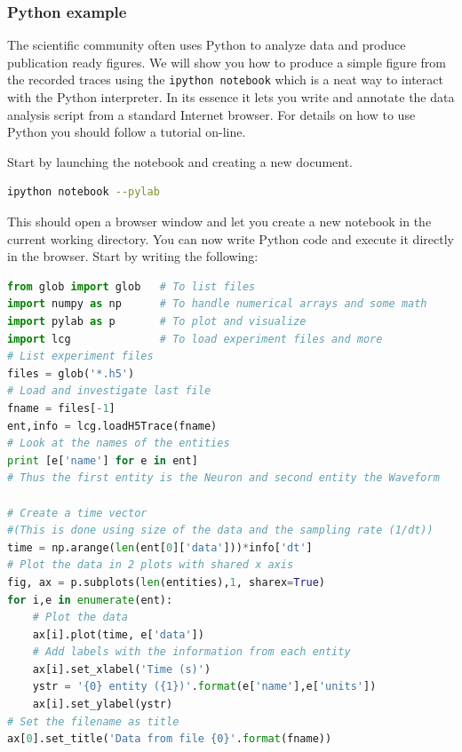 \subsubsection{Python example}
The scientific community often uses Python to analyze data and produce publication ready figures. We will show you how to produce a simple figure from the recorded traces using the \texttt{ipython notebook} which is a neat way to interact with the Python interpreter. In its essence it lets you write and annotate the data analysis script from a standard Internet browser. For details on how to use Python you should follow a tutorial on-line.

Start by launching the notebook and creating a new document. 

\begin{lstlisting}[numbers=none,language=bash]
 ipython notebook --pylab
\end{lstlisting}

This should open a browser window and let you create a new notebook in the current working directory.
You can now write Python code and execute it directly in the browser. Start by writing the following:
\renewcommand{\lstlistingname}{Example}
\begin{lstlisting}[caption={An example of a how to use Python to plot all entities in a \hdf file recorded with \progname.},label={python:plot_entities},language=Python,upquote=true]
from glob import glob   # To list files
import numpy as np      # To handle numerical arrays and some math 
import pylab as p       # To plot and visualize
import lcg              # To load experiment files and more
# List experiment files
files = glob('*.h5')
# Load and investigate last file
fname = files[-1]
ent,info = lcg.loadH5Trace(fname)
# Look at the names of the entities 
print [e['name'] for e in ent]
# Thus the first entity is the Neuron and second entity the Waveform

# Create a time vector 
#(This is done using size of the data and the sampling rate (1/dt))
time = np.arange(len(ent[0]['data']))*info['dt']
# Plot the data in 2 plots with shared x axis
fig, ax = p.subplots(len(entities),1, sharex=True)
for i,e in enumerate(ent): 
    # Plot the data
    ax[i].plot(time, e['data'])
    # Add labels with the information from each entity
    ax[i].set_xlabel('Time (s)')
    ystr = '{0} entity ({1})'.format(e['name'],e['units'])
    ax[i].set_ylabel(ystr)
# Set the filename as title
ax[0].set_title('Data from file {0}'.format(fname))
\end{lstlisting} 

